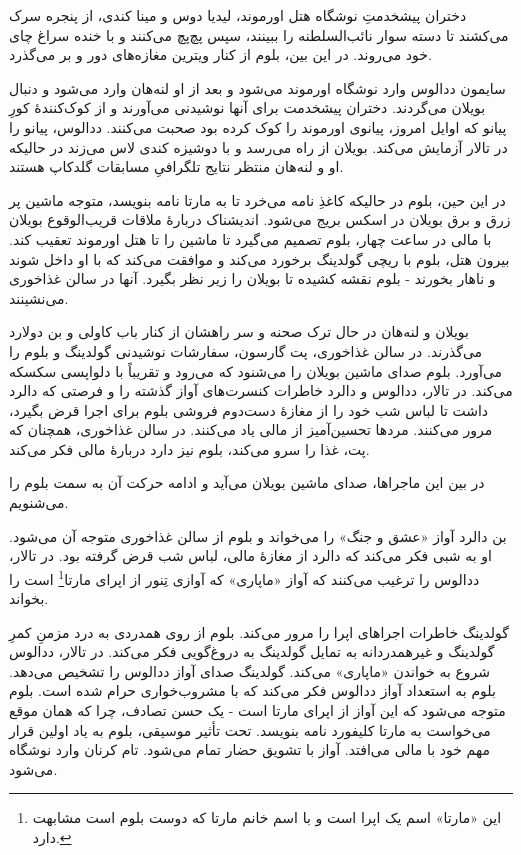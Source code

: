 \documentclass[12pt]{book}
\begin{document}
    دختران پیشخدمتِ نوشگاه هتل اورموند، لیدیا دوس و مینا کندی، از پنجره سرک می‌کشند تا دسته سوار نائب‌السلطنه را ببینند، سپس پچ‌پچ می‌کنند و با خنده سراغ چای خود می‌روند. در این بین، بلوم از کنار ویترین مغازه‌های دور و بر می‌گذرد.

    سایمون ددالوس وارد نوشگاه اورموند می‌شود و بعد از او لنه‌هان وارد می‌شود و دنبال بویلان می‌گردند. دختران پیشخدمت برای آنها نوشیدنی می‌آورند و از کوک‌کنندۀ کورِ پیانو که اوایل امروز، پیانوی اورموند را کوک کرده بود صحبت می‌کنند. ددالوس، پیانو را در تالار آزمایش می‌کند. بویلان از راه می‌رسد و با دوشیزه کندی لاس می‌زند در حالیکه او و لنه‌هان منتظر نتایج تلگرافیِ مسابقات گلدکاپ هستند.

    در این حین، بلوم در حالیکه کاغذِ نامه می‌خرد تا به مارتا نامه بنویسد، متوجه ماشین پر زرق و برق بویلان در اسکس بریج می‌شود. اندیشناک دربارۀ ملاقات قریب‌الوقوع بویلان با مالی در ساعت چهار، بلوم تصمیم می‌گیرد تا ماشین را تا هتل اورموند تعقیب کند. بیرون هتل، بلوم با ریچی گولدینگ برخورد می‌کند و موافقت می‌کند که با او داخل شوند و ناهار بخورند - بلوم نقشه کشیده تا بویلان را زیر نظر بگیرد. آنها در سالن غذاخوری می‌نشینند.

    بویلان و لنه‌هان در حال ترک صحنه و سر راهشان از کنار باب کاولی و بن دولارد می‌گذرند. در سالن غذاخوری، پت گارسون، سفارشات نوشیدنی گولدینگ و بلوم را می‌آورد. بلوم صدای ماشین بویلان را می‌شنود که می‌رود و تقریباً با دلواپسی سکسکه می‌کند. در تالار، ددالوس و دالرد  خاطرات کنسرت‌های آواز گذشته را و فرصتی که دالرد داشت تا لباس شب خود را از مغازۀ دست‌دوم فروشی بلوم برای اجرا قرض بگیرد، مرور می‌کنند. مردها تحسین‌آمیز از مالی یاد می‌کنند. در سالن غذاخوری، همچنان که پت، غذا را سرو می‌کند، بلوم نیز دارد دربارۀ مالی فکر می‌کند.

    در بین این ماجراها، صدای ماشین بویلان می‌آید و ادامه حرکت آن به سمت بلوم را می‌شنویم.

    بن دالرد آواز «عشق و جنگ» را می‌خواند و بلوم از سالن غذاخوری متوجه آن می‌شود. او به شبی فکر می‌کند که دالرد از مغازۀ مالی، لباس شب قرض گرفته بود. در تالار، ددالوس را ترغیب می‌کنند که آواز «ماپاری» که آوازی تِنور از اپرای مارتا\footnote{این «مارتا» اسم یک اپرا است و با اسم خانم مارتا که دوست بلوم است مشابهت دارد.} است را بخواند.

    گولدینگ خاطرات اجراهای اپرا را مرور می‌کند. بلوم از روی همدردی به درد مزمنِ کمرِ گولدینگ و غیرهمدردانه به تمایل گولدینگ به دروغ‌گویی فکر می‌کند. در تالار، ددالوس شروع به خواندن «ماپاری» می‌کند. گولدینگ صدای آواز ددالوس را تشخیص می‌دهد. بلوم به استعداد آواز ددالوس فکر می‌کند که با مشروب‌خواری حرام شده است. بلوم متوجه می‌شود که این آواز از اپرای مارتا است - یک حسن تصادف، چرا که همان موقع می‌خواست به مارتا کلیفورد نامه بنویسد. تحت تأثیر موسیقی، بلوم به یاد اولین قرار مهم خود با مالی می‌افتد. آواز با تشویق حضار تمام می‌شود. تام کرنان وارد نوشگاه می‌شود.
\end{document}
